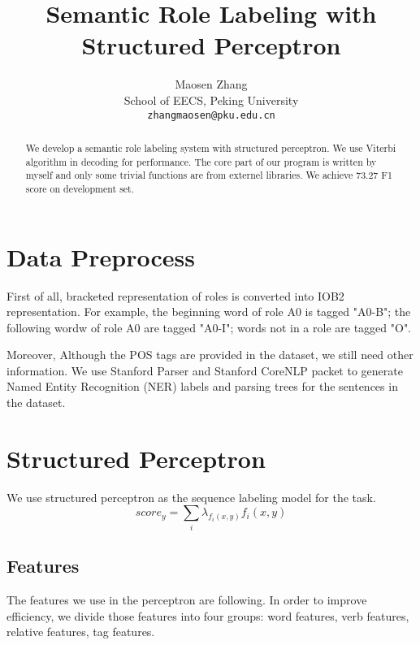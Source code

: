 \documentclass[11pt,a4paper]{article}
\title{Semantic Role Labeling with Structured Perceptron}
\author{Maosen Zhang \\
  School of EECS, Peking University \\
  {\tt zhangmaosen@pku.edu.cn} \\}
\date{}
\begin{document}
\maketitle
\begin{abstract}
  We develop a semantic role labeling system with structured perceptron. \cite{collins2002discriminative}
  We use Viterbi algorithm in decoding for performance. The core part of 
  our program is written by myself and only some trivial functions are 
  from externel libraries. We achieve 73.27 F1 score on development set.
\end{abstract}

\section{Data Preprocess}
First of all, bracketed representation of roles is converted into IOB2 representation.
For example, the beginning word of role A0 is tagged "A0-B"; 
the following wordw of role A0 are tagged "A0-I"; words not in a role are tagged "O".

Moreover, Although the POS tags are provided in the dataset, we still need other 
information. We use Stanford Parser and Stanford CoreNLP packet to 
generate Named Entity Recognition (NER) labels and parsing trees for 
the sentences in the dataset.

\section{Structured Perceptron}
We use structured perceptron as the sequence labeling model for the task.\cite{collins2002discriminative}
$$
score_y = \sum_i \lambda_{f_i(x,y)} f_i(x, y)
$$

\subsection{Features}
The features we use in the perceptron are following. In order to improve efficiency,
we divide those features into four groups: word features, verb features, 
relative features, tag features.
\end{document}
